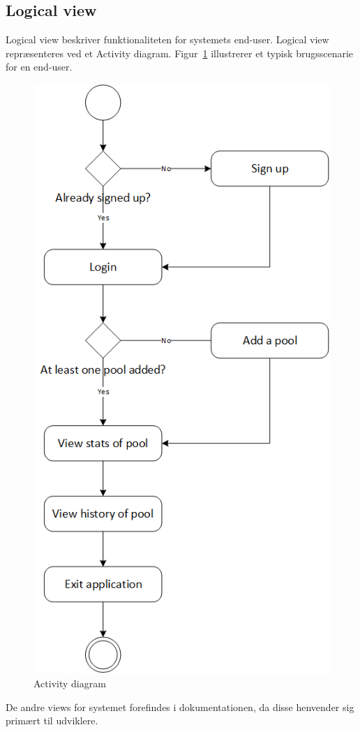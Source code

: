 \subsection{Logical view}
Logical view beskriver funktionaliteten for systemets end-user. Logical view repræsenteres ved et Activity diagram. Figur~\ref{fig:ActivityDiagram} illustrerer et typisk brugsscenarie for en end-user. 
\begin{figure}
\centering
\includegraphics[width=0.55\linewidth]{figs/arkitektur/ActivityDiagram.PNG}
\caption{Activity diagram}
\label{fig:ActivityDiagram}
\end{figure}

De andre views for systemet forefindes i dokumentationen, da disse henvender sig primært til udviklere.
